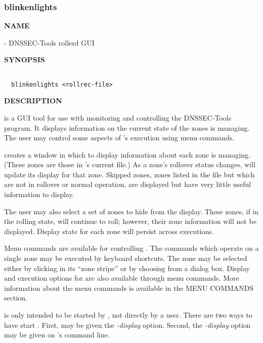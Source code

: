 \clearpage

\subsubsection{blinkenlights}

{\bf NAME}

 - DNSSEC-Tools rollerd GUI

{\bf SYNOPSIS}

\begin{verbatim}

  blinkenlights <rollrec-file>

\end{verbatim}

{\bf DESCRIPTION}

 is a GUI tool for use with monitoring and controlling the
DNSSEC-Tools  program.  It displays information on the current
state of the zones  is managing.  The user may control some
aspects of 's execution using  menu commands.

 creates a window in which to display information about
each zone  is managing.  (These zones are those in
's current  file.)  As a zone's rollover status
changes,  will update its display for that zone.  Skipped
zones, zones listed in the  file but which are not in rollover
or normal operation, are displayed but have very little useful information to
display.

The user may also select a set of zones to hide from the display.  These
zones, if in the rolling state, will continue to roll; however, their zone
information will not be displayed.  Display state for each zone will persist
across  executions.

Menu commands are available for controlling .  The commands which
operate on a single zone may be executed by keyboard shortcuts.  The zone may
be selected either by clicking in its ``zone stripe'' or by choosing from a
dialog box.  Display and execution options for  are also
available through menu commands.  More information about the menu commands is
available in the MENU COMMANDS section.

 is only intended to be started by , not
directly by a user.  There are two ways to have  start
.  First,  may be given the {\it -display}
option.  Second, the {\it -display} option may be given on 's
command line.

